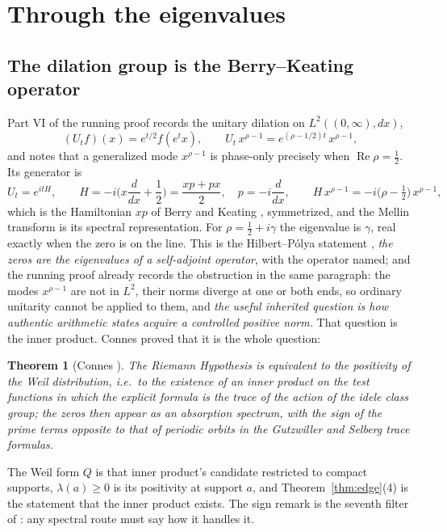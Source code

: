 \documentclass[11pt]{article}
\newtheorem{theorem}{Theorem}[section]
\theoremstyle{definition}
\theoremstyle{remark}
\newcommand{\Ree}{\operatorname{Re}}
\begin{document}
\section{Through the eigenvalues}\label{sec:eigen}

\subsection{The dilation group is the Berry--Keating operator}
Part VI of the running proof \cite[p.\ 104]{running} records the unitary dilation on $L^2((0,\infty),dx)$,
\[
(U_tf)(x)=e^{t/2}f(e^tx),\qquad U_t\,x^{\rho-1}=e^{(\rho-1/2)t}\,x^{\rho-1},
\]
and notes that a generalized mode $x^{\rho-1}$ is phase-only precisely when $\Ree\rho=\tfrac12$. Its generator is
\[
U_t=e^{itH},\qquad H=-i\Big(x\frac{d}{dx}+\frac12\Big)=\frac{xp+px}{2},\quad p=-i\frac{d}{dx},\qquad H\,x^{\rho-1}=-i\big(\rho-\tfrac12\big)\,x^{\rho-1},
\]
which is the Hamiltonian $xp$ of Berry and Keating \cite{bk}, symmetrized, and the Mellin transform is its spectral representation. For $\rho=\tfrac12+i\gamma$ the eigenvalue is $\gamma$, real exactly when the zero is on the line. This is the Hilbert--Pólya statement \cite{polya}, \emph{the zeros are the eigenvalues of a self-adjoint operator}, with the operator named; and the running proof already records the obstruction in the same paragraph: the modes $x^{\rho-1}$ are not in $L^2$, their norms diverge at one or both ends, so ordinary unitarity cannot be applied to them, and \emph{the useful inherited question is how authentic arithmetic states acquire a controlled positive norm.} That question is the inner product. Connes proved that it is the whole question:
\begin{theorem}[Connes \cite{connes99}]\label{thm:connes}
The Riemann Hypothesis is equivalent to the positivity of the Weil distribution, i.e.\ to the existence of an inner product on the test functions in which the explicit formula is the trace of the action of the idele class group; the zeros then appear as an absorption spectrum, with the sign of the prime terms opposite to that of periodic orbits in the Gutzwiller and Selberg trace formulas.
\end{theorem}
The Weil form $Q$ is that inner product's candidate restricted to compact supports, $\lambda(a)\ge0$ is its positivity at support $a$, and Theorem~\ref{thm:edge}(4) is the statement that the inner product exists. The sign remark is the seventh filter of \cite{routes}: any spectral route must say how it handles it.
\end{document}
